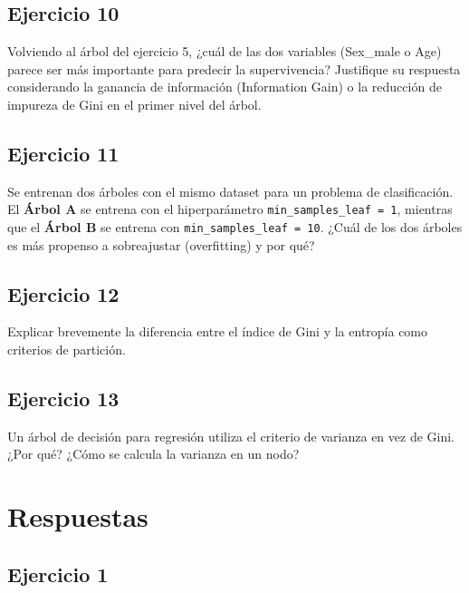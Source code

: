 \documentclass[12pt]{article}
\begin{document}
\subsection{Ejercicio 10}

Volviendo al árbol del ejercicio 5, ¿cuál de las dos variables (Sex\_male o Age) parece ser más importante para predecir la supervivencia? Justifique su respuesta considerando la ganancia de información (Information Gain) o la reducción de impureza de Gini en el primer nivel del árbol.

\subsection{Ejercicio 11}

Se entrenan dos árboles con el mismo dataset para un problema de clasificación. El \textbf{Árbol A} se entrena con el hiperparámetro \texttt{min\_samples\_leaf = 1}, mientras que el \textbf{Árbol B} se entrena con \texttt{min\_samples\_leaf = 10}. ¿Cuál de los dos árboles es más propenso a sobreajustar (overfitting) y por qué?

\subsection{Ejercicio 12}

Explicar brevemente la diferencia entre el índice de Gini y la entropía como criterios de partición.

\subsection{Ejercicio 13}

Un árbol de decisión para regresión utiliza el criterio de varianza en vez de Gini. ¿Por qué? ¿Cómo se calcula la varianza en un nodo?

\newpage

\section{Respuestas}

\subsection{Ejercicio 1}
\end{document}

